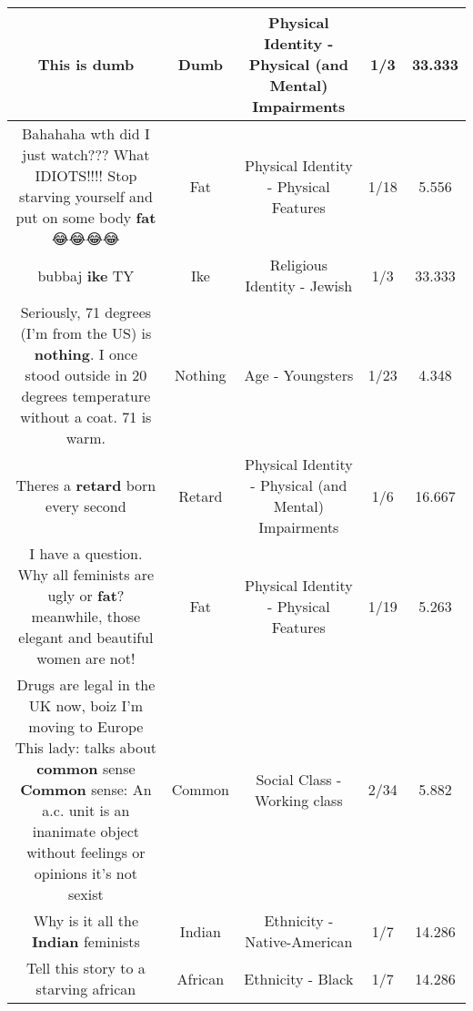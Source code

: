 \documentclass[11pt]{article}
\newlength\mylength
\begin{document}
\begin{center}
\begin{longtable}{|C{.65\mylength}|C{.30\mylength}|C{.12\mylength}|C{.12\mylength}|C{.12\mylength}|}
  \small This is dumb\normalsize   & Dumb & Physical Identity - Physical (and Mental) Impairments & 1/3 & 33.333 \\  \hline
  \small Bahahaha wth did I just watch??? What IDIOTS!!!! Stop starving yourself and put on some body \textbf{fat} 😂😂😂😂\normalsize   & Fat & Physical Identity - Physical Features & 1/18 & 5.556 \\  \hline
  \small bubbaj \textbf{ike} TY\normalsize   & Ike & Religious Identity - Jewish & 1/3 & 33.333 \\  \hline
  \small Seriously, 71 degrees (I'm from the US) is \textbf{nothing}. I once stood outside in 20 degrees temperature without a coat. 71 is warm.\normalsize   & Nothing & Age - Youngsters & 1/23 & 4.348 \\  \hline
  \small Theres a \textbf{retard} born every second\normalsize   & Retard & Physical Identity - Physical (and Mental) Impairments & 1/6 & 16.667 \\  \hline
  \small I have a question. Why all feminists are ugly or \textbf{fat}? meanwhile, those elegant and beautiful women are not!\normalsize   & Fat & Physical Identity - Physical Features & 1/19 & 5.263 \\  \hline
  \small Drugs are legal in the UK now, boiz I'm moving to Europe This lady: talks about \textbf{common} sense  \textbf{Common} sense: An a.c. unit is an inanimate object without feelings or opinions it's not sexist\normalsize   & Common & Social Class - Working class & 2/34 & 5.882 \\  \hline
  \small Why is it all the \textbf{Indian} feminists\normalsize   & Indian & Ethnicity - Native-American & 1/7 & 14.286 \\  \hline
  \small Tell this story to a starving african\normalsize   & African & Ethnicity - Black & 1/7 & 14.286 \\  \hline

\end{longtable}
\end{center}
\end{document}
